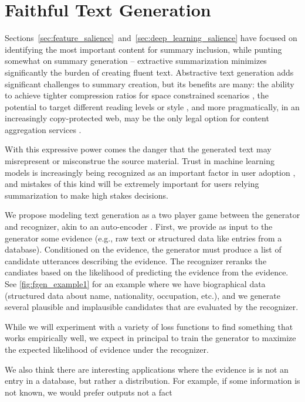 \section{Faithful Text Generation}
\label{sec:chapter5}

Sections~\ref{sec:feature_salience}~and~\ref{sec:deep_learning_salience}
have focused on identifying the most important content for summary inclusion,
while punting somewhat on summary generation -- extractive summarization 
minimizes significantly the burden of creating fluent text. 
Abstractive text generation adds significant challenges to summary creation, 
but its benefits are many: the ability to achieve tighter compression ratios
for space constrained scenarios \citep{fan2017controllable}, the potential
to target different reading levels \citep{margarido2008automatic}
or style \citep{shen2017style}, and more pragmatically, in
an increasingly copy-protected web, may be the only legal option for content
aggregation services \citep{kassam2014google}.

With this expressive power comes the danger that the generated text may
misrepresent or misconstrue the source material. Trust in machine learning
models is increasingly being recognized as an important factor in user 
adoption \citep{ribeiro2016should}, and mistakes of this kind will be extremely
important for users relying summarization to make high stakes decisions.



We propose modeling text generation as a two player game between the generator
and recognizer, akin to an auto-encoder \citep{ae}. 
First, we provide as input to the 
generator some evidence (e.g., raw text or structured data like entries 
from a database). Conditioned on the evidence, the generator must produce 
a list of candidate utterances describing the evidence. The recognizer
reranks the candiates based on the likelihood of predicting the evidence
from the evidence. See \autoref{fig:fgen_example1} for an example 
where we have biographical data (structured data about name, nationality, 
occupation, etc.), and we generate several plausible and implausible 
candidates that are evaluated by the recognizer.

While we will experiment with a variety of loss functions to find something
that works empirically well, we expect in principal to train the generator
to maximize the expected likelihood of evidence under the recognizer.




We also think there are interesting applications where the evidence is
is not an entry in a database, but rather a distribution. For example,
if some information is not known, we would prefer outputs 
not a fact 



